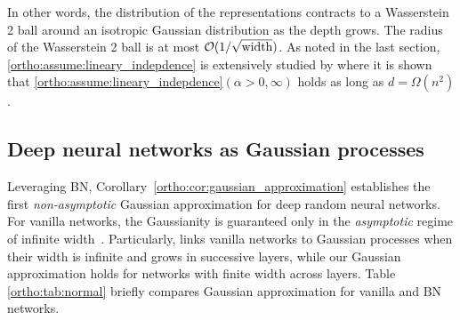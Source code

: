 

In other words, the distribution of the representations contracts to a Wasserstein 2 ball around an isotropic Gaussian distribution as the depth grows. The radius of the Wasserstein 2 ball is at most $\mathcal{O}(1/\sqrt{\text{width}})$.
As noted in the last section, \ref{ortho:assume:lineary_indepdence} is extensively studied by \cite{daneshmand2020batch} where it is shown that \ref{ortho:assume:lineary_indepdence}$(\alpha>0,\infty)$ holds as long as $d = \Omega(n^2)$. 

\subsection{Deep neural networks as Gaussian processes}
Leveraging BN, Corollary~\ref{ortho:cor:gaussian_approximation} establishes the first \textit{non-asymptotic} Gaussian approximation for deep random neural networks. For vanilla networks, the Gaussianity is guaranteed only in the \textit{asymptotic} regime of infinite width~\citep{garriga2018deep,neal2012bayesian,lee2017deep,neal2012bayesian,hazan2015steps}. Particularly, \cite{matthews2018gaussian} links vanilla networks to Gaussian processes when their width is infinite and grows in successive layers, while our Gaussian approximation holds for networks with finite width across layers. 
Table \ref{ortho:tab:normal} briefly compares Gaussian approximation for vanilla and BN networks.

